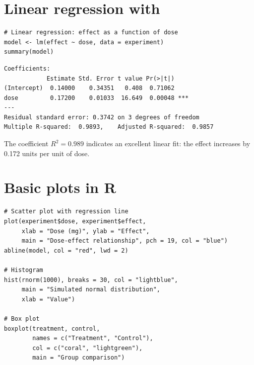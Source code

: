 \section{Linear regression with }

\begin{codeblock}[title=\textbf{R}]
\begin{verbatim}
# Linear regression: effect as a function of dose
model <- lm(effect ~ dose, data = experiment)
summary(model)
\end{verbatim}
\end{codeblock}

\begin{codeoutput}
\begin{verbatim}
Coefficients:
            Estimate Std. Error t value Pr(>|t|)
(Intercept)  0.14000    0.34351   0.408  0.71062
dose         0.17200    0.01033  16.649  0.00048 ***
---
Residual standard error: 0.3742 on 3 degrees of freedom
Multiple R-squared:  0.9893,	Adjusted R-squared:  0.9857
\end{verbatim}
\end{codeoutput}

The coefficient $R^2 = 0.989$ indicates an excellent linear fit:
the effect increases by 0.172 units per unit of dose.

\section{Basic plots in R}

\begin{codeblock}[title=\textbf{R}]
\begin{verbatim}
# Scatter plot with regression line
plot(experiment$dose, experiment$effect,
     xlab = "Dose (mg)", ylab = "Effect",
     main = "Dose-effect relationship", pch = 19, col = "blue")
abline(model, col = "red", lwd = 2)

# Histogram
hist(rnorm(1000), breaks = 30, col = "lightblue",
     main = "Simulated normal distribution",
     xlab = "Value")

# Box plot
boxplot(treatment, control,
        names = c("Treatment", "Control"),
        col = c("coral", "lightgreen"),
        main = "Group comparison")
\end{verbatim}
\end{codeblock}

